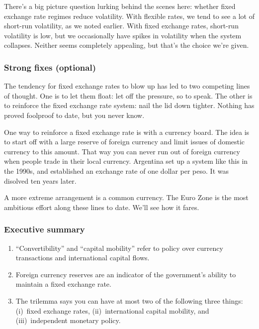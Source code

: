 \documentclass[letterpaper,12pt]{article}
\begin{document}
There's a big picture question lurking behind the scenes here:
whether fixed exchange rate regimes reduce volatility.
With flexible rates, we tend to see a lot of short-run volatility,
as we noted earlier.
With fixed exchange rates, short-run volatility is low,
but we occasionally have spikes in volatility when the system collapses.
Neither seems completely appealing, but that's the choice we're given.


\subsubsection*{Strong fixes (optional)}

The tendency for fixed exchange rates to blow up has led to two
competing lines of thought.
One is to let them float:  let off the pressure, so to speak.
The other is to reinforce the fixed exchange rate system:
nail the lid down tighter.
Nothing has proved foolproof to date, but you never know.

One way to reinforce a fixed exchange rate is with a currency board.
The idea is to start off with a large reserve of foreign currency
and limit issues of domestic currency to this amount.
That way you can never run out of foreign currency when people trade
in their local currency.
Argentina set up a system like this in the 1990s, and established
an exchange rate of one dollar per peso.
It was disolved ten years later.

A more extreme arrangement is a common currency.
The Euro Zone is the most ambitious effort along these lines to date.
We'll see how it fares.


\subsubsection*{Executive summary}

\begin{enumerate}
\item ``Convertibility'' and ``capital mobility'' refer to
policy over currency transactions
and international capital flows.

\item Foreign currency reserves are an indicator of the
government's ability to maintain a fixed exchange rate.

\item The trilemma says you can have at most two of the following three
things:
(i)~fixed exchange rates,
(ii)~international capital mobility, and
(iii)~independent monetary policy.
\end{enumerate}
\end{document}
